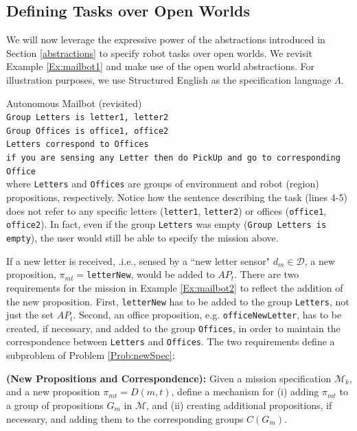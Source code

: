 \subsection{Defining Tasks over Open Worlds}

We will now leverage the expressive power of the abstractions introduced in Section \ref{abstractions} to specify robot tasks over open worlds. We revisit Example \ref{Ex:mailbot1} and make use of the open world abstractions. For illustration purposes, we use Structured English as the specification language $\Lambda$.

\begin{myExample}\label{Ex:mailbot2} Autonomous Mailbot (revisited)\\
\texttt{Group Letters is letter1, letter2}\\
\texttt{Group Offices is office1, office2}\\
\texttt{Letters correspond to Offices}\\
\texttt{if you are sensing any Letter then do PickUp and go to corresponding Office}\\ 
where \texttt{Letters} and \texttt{Offices} are groups of environment and robot (region) propositions, respectively. Notice how the sentence describing the task (lines 4-5) does not refer to any specific letters (\texttt{letter1}, \texttt{letter2}) or offices (\texttt{office1}, \texttt{office2}). In fact, even if the group \texttt{Letters} was empty (\texttt{Group Letters is empty}), the user would still be able to specify the mission above.
\end{myExample}

If a new letter is received, .i.e., sensed by a ``new letter sensor" $d_{m} \in \mathcal{D}$, a new proposition, $\pi_{mt} = $\texttt{letterNew}, would be added to $AP_t$. There are two requirements for the mission in Example \ref{Ex:mailbot2} to reflect the addition of the new proposition. First, \texttt{letterNew} has to be added to the group \texttt{Letters}, not just the set $AP_t$. Second, an office proposition, e.g. \texttt{officeNewLetter}, has to be created, if necessary, and added to the group \texttt{Offices}, in order to maintain the correspondence between \texttt{Letters} and \texttt{Offices}. The two requirements define a subproblem of Problem \ref{Prob:newSpec}:

\begin{myProblem}\label{Prob:correspondence}
	\textbf{(New Propositions and Correspondence):} Given a mission specification $\mathcal{M}_k$, and a new proposition $\pi_{mt} = D(m, t)$, define a mechanism for (i) adding $\pi_{mt}$ to a group of propositions $G_m$ in $\mathcal{M}$, and (ii) creating additional propositions, if necessary, and adding them to the corresponding groups $C(G_m)$.
\end{myProblem}

